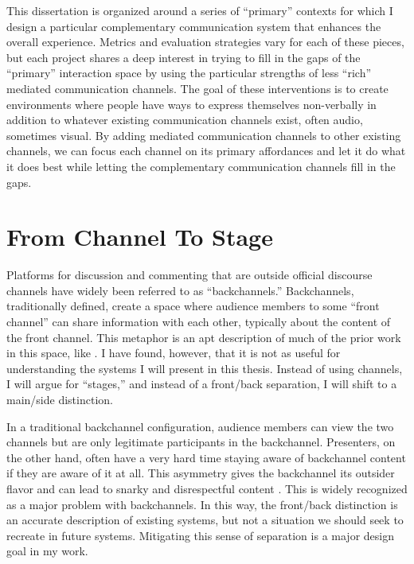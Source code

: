This dissertation is organized around a series of ``primary'' contexts for which I design a particular complementary communication system that enhances the overall experience. Metrics and evaluation strategies vary for each of these pieces, but each project shares a deep interest in trying to fill in the gaps of the ``primary'' interaction space by using the particular strengths of less ``rich'' mediated communication channels. The goal of these interventions is to create environments where people have ways to express themselves non-verbally in addition to whatever existing communication channels exist, often audio, sometimes visual. By adding mediated communication channels to other existing channels, we can focus each channel on its primary affordances and let it do what it does best while letting the complementary communication channels fill in the gaps.


\section{From Channel To Stage}

Platforms for discussion and commenting that are outside official discourse channels have widely been referred to as ``backchannels.''  Backchannels, traditionally defined, create a space where audience members to some ``front channel'' can share information with each other, typically about the content of the front channel.  This metaphor is an apt description of much of the prior work in this space, like \citep{Cogdill:2001fp,Yardi:2006uk,mccarthy_digital_2004,Rekimoto:1998jy}. I have found, however, that it is not as useful for understanding the systems I will present in this thesis. Instead of using channels, I will argue for ``stages,'' and instead of a front/back separation, I will shift to a main/side distinction. 


In a traditional backchannel configuration, audience members can view the two channels but are only legitimate participants in the backchannel. Presenters, on the other hand, often have a very hard time staying aware of backchannel content if they are aware of it at all. This asymmetry gives the backchannel its outsider flavor and can lead to snarky and disrespectful content \citep{boyd:Yo36SNyj}. This is widely recognized as a major problem with backchannels. In this way, the front/back distinction is an accurate description of existing systems, but not a situation we should seek to recreate in future systems. Mitigating this sense of separation is a major design goal in my work.




